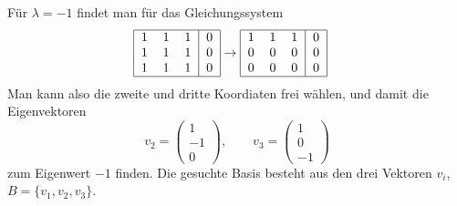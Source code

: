 \begin{loesung}
Für $\lambda=-1$ findet man für das Gleichungssystem
\begin{align*}
\begin{tabular}{|ccc|c|}
\hline
1&1&1&0\\
1&1&1&0\\
1&1&1&0\\
\hline
\end{tabular}
&\rightarrow
\begin{tabular}{|ccc|c|}
\hline
1&1&1&0\\
0&0&0&0\\
0&0&0&0\\
\hline
\end{tabular}
\end{align*}
Man kann also die zweite und dritte Koordiaten frei wählen, und damit
die Eigenvektoren
\[
v_2=\begin{pmatrix}1\\-1\\0\end{pmatrix},\qquad
v_3=\begin{pmatrix}1\\0\\-1\end{pmatrix}
\]
zum Eigenwert $-1$ finden. Die gesuchte Basis besteht aus den
drei Vektoren $v_i$, $B=\{v_1,v_2,v_3\}$.
\end{loesung}

